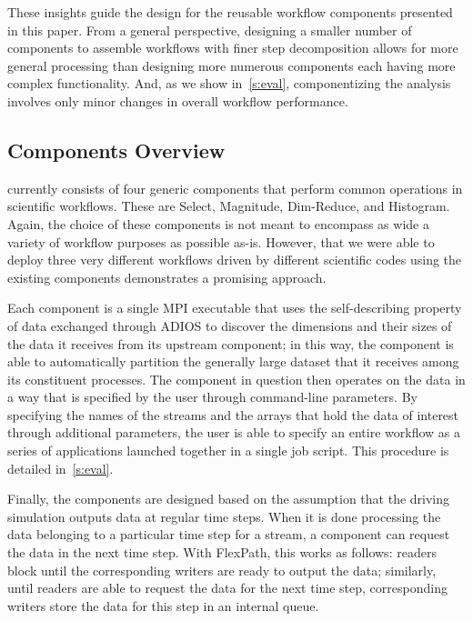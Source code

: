 These insights guide the design for the
reusable workflow components presented in this
paper. From a general perspective, designing a smaller number of
components to assemble workflows with finer step decomposition
allows for more general processing
than designing more numerous components each having more
complex functionality.
And, as we show in~\autoref{s:eval}, componentizing
the analysis involves only minor changes
in overall workflow performance.

\subsection{Components Overview}

\sys currently consists of four generic components
that perform common operations
in scientific workflows. These are Select,
Magnitude, Dim-Reduce, and Histogram.
Again, the choice of these components
is not meant to encompass as wide a variety
of workflow purposes as possible as-is.
However, that we were able to deploy three
very different workflows driven by different
scientific codes using the existing \sys
components demonstrates a promising approach.

Each component is a single MPI executable
that uses the self-describing property
of data exchanged through ADIOS
to discover the dimensions and their sizes of
the data it receives from its upstream component;
in this way, the component is able to
automatically partition the generally
large dataset that it receives
among its constituent processes.
The component in question
then operates on the data
in a way that is specified by the user
through command-line parameters.
By specifying the names of the streams
and the arrays that hold the data
of interest through additional parameters, the
user is able to specify an entire
workflow as a series of 
applications launched together in a single
job script.
This procedure is detailed in~\autoref{s:eval}.

Finally, the components are designed
based on the assumption that the driving simulation
outputs data at regular time steps.
When it is done processing the data belonging
to a particular time step for a stream, a component
can request the data in the next time step.
With FlexPath, this works as follows:
readers block until
the corresponding writers
are ready to output the data;
similarly, until readers are able to
request the data for the next time step,
corresponding writers store the data for
this step in an internal queue.

